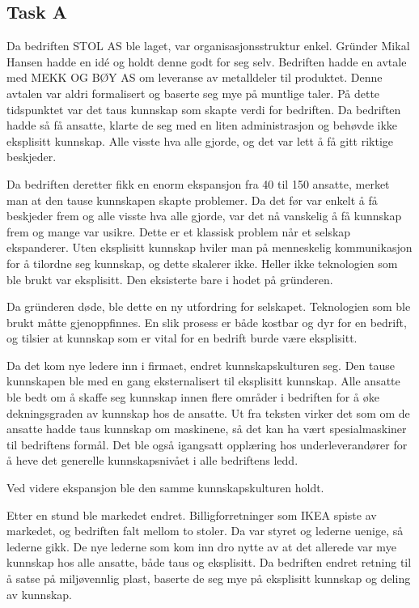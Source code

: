 \subsection{Task A}
Da bedriften STOL AS ble laget, var organisasjonsstruktur enkel.
Gründer Mikal Hansen hadde en idé og holdt denne godt for seg selv.
Bedriften hadde en avtale med MEKK OG BØY AS om leveranse av metalldeler til produktet. Denne avtalen var aldri formalisert og baserte seg mye på muntlige taler.
På dette tidspunktet var det taus kunnskap som skapte verdi for bedriften.
Da bedriften hadde så få ansatte, klarte de seg med en liten administrasjon og behøvde ikke eksplisitt kunnskap. Alle visste hva alle gjorde, og det var lett å få gitt riktige beskjeder.

Da bedriften deretter fikk en enorm ekspansjon fra 40 til 150 ansatte, merket man at den tause kunnskapen skapte problemer. Da det før var enkelt å få beskjeder frem og alle visste hva alle gjorde, var det nå vanskelig å få kunnskap frem og mange var usikre.
Dette er et klassisk problem når et selskap ekspanderer.
Uten eksplisitt kunnskap hviler man på menneskelig kommunikasjon for å tilordne seg kunnskap, og dette skalerer ikke.
Heller ikke teknologien som ble brukt var eksplisitt. Den eksisterte bare i hodet på gründeren.

Da gründeren døde, ble dette en ny utfordring for selskapet. Teknologien som ble brukt måtte gjenoppfinnes.
En slik prosess er både kostbar og dyr for en bedrift, og tilsier at kunnskap som er vital for en bedrift burde være eksplisitt.

Da det kom nye ledere inn i firmaet, endret kunnskapskulturen seg. Den tause kunnskapen ble med en gang eksternalisert til eksplisitt kunnskap.
Alle ansatte ble bedt om å skaffe seg kunnskap innen flere områder i bedriften for å øke dekningsgraden av kunnskap hos de ansatte.
Ut fra teksten virker det som om de ansatte hadde taus kunnskap om maskinene, så det kan ha vært spesialmaskiner til bedriftens formål.
Det ble også igangsatt opplæring hos underleverandører for å heve det generelle kunnskapsnivået i alle bedriftens ledd.

Ved videre ekspansjon ble den samme kunnskapskulturen holdt.

Etter en stund ble markedet endret. Billigforretninger som IKEA spiste av markedet, og bedriften falt mellom to stoler. Da var styret og lederne uenige, så lederne gikk.
De nye lederne som kom inn dro nytte av at det allerede var mye kunnskap hos alle ansatte, både taus og eksplisitt.
Da bedriften endret retning til å satse på miljøvennlig plast, baserte de seg mye på eksplisitt kunnskap og deling av kunnskap.

